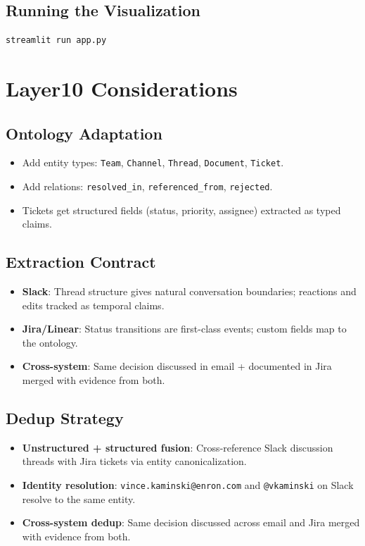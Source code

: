 \documentclass[11pt,a4paper]{article}
\begin{document}
\subsection{Running the Visualization}
\begin{lstlisting}[language=bash]
streamlit run app.py
\end{lstlisting}

\section{Layer10 Considerations}

\subsection{Ontology Adaptation}
\begin{itemize}[nosep]
    \item Add entity types: \texttt{Team}, \texttt{Channel}, \texttt{Thread}, \texttt{Document}, \texttt{Ticket}.
    \item Add relations: \texttt{resolved\_in}, \texttt{referenced\_from}, \texttt{rejected}.
    \item Tickets get structured fields (status, priority, assignee) extracted as typed claims.
\end{itemize}

\subsection{Extraction Contract}
\begin{itemize}[nosep]
    \item \textbf{Slack}: Thread structure gives natural conversation boundaries; reactions and edits tracked as temporal claims.
    \item \textbf{Jira/Linear}: Status transitions are first-class events; custom fields map to the ontology.
    \item \textbf{Cross-system}: Same decision discussed in email + documented in Jira merged with evidence from both.
\end{itemize}

\subsection{Dedup Strategy}
\begin{itemize}[nosep]
    \item \textbf{Unstructured + structured fusion}: Cross-reference Slack discussion threads with Jira tickets via entity canonicalization.
    \item \textbf{Identity resolution}: \texttt{vince.kaminski@enron.com} and \texttt{@vkaminski} on Slack resolve to the same entity.
    \item \textbf{Cross-system dedup}: Same decision discussed across email and Jira merged with evidence from both.
\end{itemize}
\end{document}
